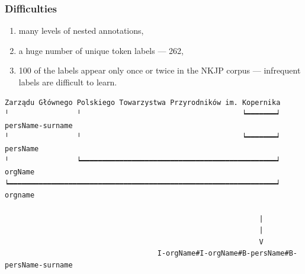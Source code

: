 \documentclass[Warsaw]{beamer}
\begin{document}
\begin{frame}[fragile]
    \frametitle{Difficulties}
    
    \begin{enumerate}
        \item many levels of nested annotations,
        \item a huge number of unique token labels --- 262,
        \item 100 of the labels appear only once or twice in the NKJP corpus --- infrequent labels are difficult to learn.
    \end{enumerate}
    
    
\tiny
    \begin{verbatim}
Zarządu Głównego Polskiego Towarzystwa Przyrodników im. Kopernika
╵                ╵                                      ┕━━━━━━━┙   persName-surname
╵                ╵                                      ┕━━━━━━━┙   persName
╵                ┕━━━━━━━━━━━━━━━━━━━━━━━━━━━━━━━━━━━━━━━━━━━━━━┙   orgName
┕━━━━━━━━━━━━━━━━━━━━━━━━━━━━━━━━━━━━━━━━━━━━━━━━━━━━━━━━━━━━━━━┙   orgname

                                                            |
                                                            |
                                                            V
                                    I-orgName#I-orgName#B-persName#B-persName-surname
    \end{verbatim}
    
\end{frame}

\end{document}
